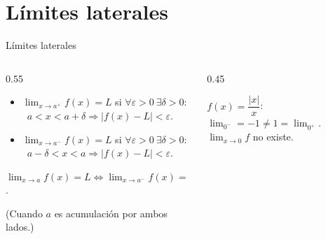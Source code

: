 \documentclass[10pt,aspectratio=169]{beamer}
\begin{document}
\section{Límites laterales}

\begin{frame}{Límites laterales}
  \begin{columns}
    \begin{column}{0.55\textwidth}
      \begin{definicion}
        \begin{itemize}
          \item $\displaystyle\lim_{x\to a^+}f(x)=L$ si $\forall\varepsilon>0\ \exists\delta>0$: \ $a<x<a+\delta\Rightarrow|f(x)-L|<\varepsilon$.
          \item $\displaystyle\lim_{x\to a^-}f(x)=L$ si $\forall\varepsilon>0\ \exists\delta>0$: \ $a-\delta<x<a\Rightarrow|f(x)-L|<\varepsilon$.
        \end{itemize}
      \end{definicion}
      \begin{teorema}
        $\displaystyle\lim_{x\to a}f(x)=L\iff\lim_{x\to a^-}f(x)=\lim_{x\to a^+}f(x)=L$.
      \end{teorema}
      \small (Cuando $a$ es acumulación por ambos lados.)
    \end{column}
    \begin{column}{0.45\textwidth}
      \centering

      \small $f(x)=\dfrac{|x|}{x}$: \ $\lim_{0^-}=-1\neq1=\lim_{0^+}$. \ $\lim_{x\to0}f$ no existe.
    \end{column}
  \end{columns}
\end{frame}
\end{document}
